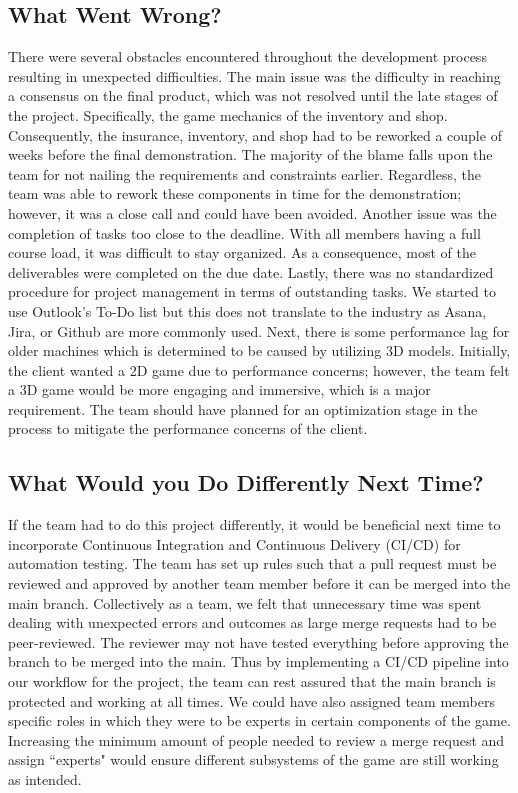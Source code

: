 \documentclass{article}
\begin{document}
\subsection{What Went Wrong?}
There were several obstacles encountered throughout the development process resulting in unexpected difficulties. The main issue was the difficulty in reaching a consensus on the final product, which was not resolved until the late stages of the project. Specifically, the game mechanics of the inventory and shop. Consequently, the insurance, inventory, and shop had to be reworked a couple of weeks before the final demonstration. The majority of the blame falls upon the team for not nailing the requirements and constraints earlier. Regardless, the team was able to rework these components in time for the demonstration; however, it was a close call and could have been avoided. Another issue was the completion of tasks too close to the deadline. With all members having a full course load, it was difficult to stay organized. As a consequence, most of the deliverables were completed on the due date.  Lastly, there was no standardized procedure for project management in terms of outstanding tasks. We started to use Outlook's To-Do list but this does not translate to the industry as Asana, Jira, or Github are more commonly used. Next, there is some performance lag for older machines which is determined to be caused by utilizing 3D models. Initially, the client wanted a 2D game due to performance concerns; however, the team felt a 3D game would be more engaging and immersive, which is a major requirement. The team should have planned for an optimization stage in the process to mitigate the performance concerns of the client.


\subsection{What Would you Do Differently Next Time?}
If the team had to do this project differently, it would be beneficial next time to incorporate Continuous Integration and Continuous Delivery (CI/CD) for automation testing. The team has set up rules such that a pull request must be reviewed and approved by another team member before it can be merged into the main branch. Collectively as a team, we felt that unnecessary time was spent dealing with unexpected errors and outcomes as large merge requests had to be peer-reviewed. The reviewer may not have tested everything before approving the branch to be merged into the main. Thus by implementing a  CI/CD pipeline into our workflow for the project, the team can rest assured that the main branch is protected and working at all times. We could have also assigned team members specific roles in which they were to be experts in certain components of the game. Increasing the minimum amount of people needed to review a merge request and assign  ``experts" would ensure different subsystems of the game are still working as intended. 
\end{document}

